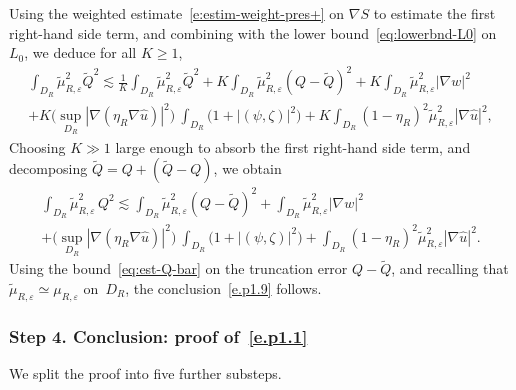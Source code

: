 \documentclass[JEP,XML,SOM,Unicode,published]{cedram}
\theoremstyle{plain}
\theoremstyle{definition}
\newcommand{\e}{\varepsilon}
\newcommand{\step}[1]{\subsubsection*{Step #1}}
\begin{document}
Using the weighted estimate~\eqref{e:estim-weight-pres+} on $\nabla S$ to estimate the first right-hand side term, and combining with the lower bound~\eqref{eq:lowerbnd-L0} on $L_0$, we deduce for all $K\ge1$,
\begin{multline*}
\int_{D_R}\tilde\mu_{R,\e}^2\tilde Q^2
\lesssim \frac1K\int_{D_R}\tilde\mu_{R,\e}^{2}\tilde Q^2
+K\int_{D_R}\tilde\mu_{R,\e}^2(Q-\tilde Q)^2
+K\int_{D_R}\tilde\mu_{R,\e}^2|\nabla w|^2\\
+K\Big(\sup_{D_R}|\nabla(\eta_R\nabla\hat u)|^2\Big)~\int_{D_R}\big(1+|(\psi,\zeta)|^2\big)
+K\int_{D_R}(1-\eta_R)^2\tilde\mu_{R,\e}^2|\nabla\hat u|^2,
\end{multline*}
Choosing $K\gg1$ large enough to absorb the first right-hand side term, and decomposing $\tilde Q=Q+(\tilde Q-Q)$, we obtain
\begin{multline*}
\int_{D_R}\tilde\mu_{R,\e}^2\, Q^2
\lesssim 
\int_{D_R}\tilde\mu_{R,\e}^2(Q-\tilde Q)^2
+\int_{D_R}\tilde\mu_{R,\e}^2|\nabla w|^2\\
+\Big(\sup_{D_R}|\nabla(\eta_R\nabla\hat u)|^2\Big)~\int_{D_R}\big(1+|(\psi,\zeta)|^2\big)
+\int_{D_R}(1-\eta_R)^2\tilde\mu_{R,\e}^2|\nabla\hat u|^2.
\end{multline*}
Using the bound~\eqref{eq:est-Q-bar} on the truncation error $Q-\tilde Q$, and recalling that $\tilde\mu_{R,\e}\simeq\mu_{R,\e}$ on~$D_R$, the conclusion~\eqref{e.p1.9} follows.

\step{4. Conclusion: proof of~\eqref{e.p1.1}}
We split the proof into five further substeps.
\end{document}
